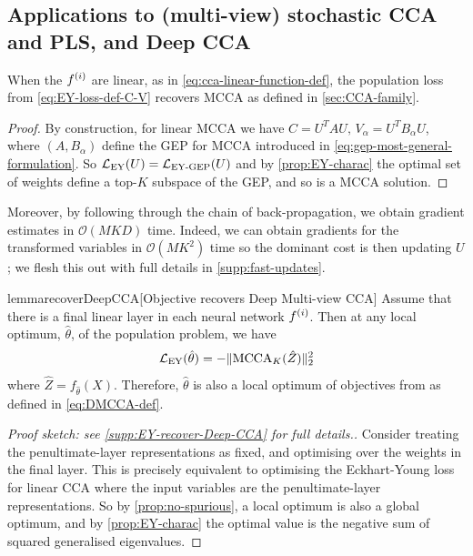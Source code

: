 \subsection{Applications to (multi-view) stochastic CCA and PLS, and Deep CCA}
\begin{lemma}
    When the $f^{(i)}$ are linear, as in \cref{eq:cca-linear-function-def}, the population loss from \cref{eq:EY-loss-def-C-V} recovers MCCA as defined in \cref{sec:CCA-family}. %
\end{lemma}
\begin{proof}
    By construction, for linear MCCA we have $C = U^T A U,\, V_\alpha=U^T B_\alpha U$, where $(A, B_\alpha)$ define the GEP for MCCA introduced in \cref{eq:gep-most-general-formulation}.
    So $\mathcal{L}_\text{EY}(U) = \mathcal{L}_\text{EY-GEP}(U)$ and by \cref{prop:EY-charac} the optimal set of weights define a top-$K$ subspace of the GEP, and so is a MCCA solution.
\end{proof}

Moreover, by following through the chain of back-propagation, we obtain gradient estimates in $\mathcal{O}(MKD)$ time.
Indeed, we can obtain gradients for the transformed variables in $\mathcal{O}(M K^2)$ time so the dominant cost is then updating $U$; we flesh this out with full details in \cref{supp:fast-updates}.

\begin{restatable}{lemma}{recoverDeepCCA}[Objective recovers Deep Multi-view CCA]\label{lem:recover-DeepCCA}
Assume that there is a final linear layer in each neural network $f^{(i)}$.
Then at any local optimum, $\hat{\theta}$, of the population problem, we have
\begin{align*}
    \mathcal{L}_\text{EY}(\hat{\theta}) = - \lVert\operatorname{MCCA}_K(\hat{Z})\rVert_2^2
\end{align*}
where $\hat{Z} = f_{\hat{\theta}}(X)$.
Therefore, $\hat{\theta}$ is also a local optimum of objectives from \cite{andrew2013deep, somandepalli2019multimodal} as defined in \cref{eq:DMCCA-def}.
\end{restatable}
\begin{proof}[Proof sketch: see \cref{supp:EY-recover-Deep-CCA} for full details.]
    Consider treating the penultimate-layer representations as fixed, and optimising over the weights in the final layer. This is precisely equivalent to optimising the Eckhart-Young loss for linear CCA where the input variables are the penultimate-layer representations. So by \cref{prop:no-spurious}, a local optimum is also a global optimum, and by \cref{prop:EY-charac} the optimal value is the negative sum of squared generalised eigenvalues.
\end{proof}

